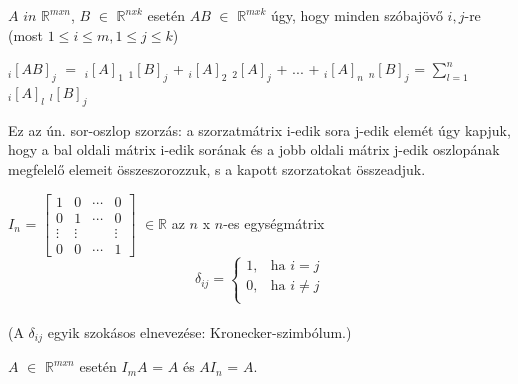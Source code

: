 	\begin{frame}

		\begin{tcolorbox}[title={Def.: Mátrixszorzás}]	
			$A$ $in$ $\mathbb{R}^{m x n}$, $B$ $\in$ $\mathbb{R}^{n x k}$ esetén $AB$ $\in$ $\mathbb{R}^{m x k}$ úgy, hogy minden szóbajövő $i, j$-re (most $1 \leq i \leq m, 1 \leq j \leq k$)
			\mmedskip
	
			$_{i} [AB]_j$ $=$ $_{i} [A]_1$ $_{1} [B]_j$ + $_{i} [A]_2$ $_{2} [A]_j$ + $...$ + $_{i} [A]_n$ $_{n} [B]_j$ = $\sum_{l = 1}^n$ $_{i} [A]_l$ $_{l} [B]_j$
			\mmedskip

			Ez az ún. sor-oszlop szorzás: a szorzatmátrix i-edik sora j-edik elemét úgy kapjuk, hogy a bal oldali mátrix i-edik sorának és a jobb oldali mátrix j-edik oszlopának megfelelő elemeit összeszorozzuk, s a kapott szorzatokat összeadjuk.
		\end{tcolorbox}		
		
		\begin{tcolorbox}[title={Def.: Egységmátrix}]	
			$I_n$ = $\begin{bmatrix} 
  				1 & 0 & \cdots & 0 \\ 
  				0 & 1 & \cdots & 0 \\
  				\vdots & \vdots &  & \vdots \\
  				0 & 0 & \cdots & 1
			\end{bmatrix}$ $\in \mathbb{R}$ az $n$ x $n$-es egységmátrix\\
			
			
			\[
   				{\delta}_{ij} = 
			\begin{cases}
   				1, & \text{ha } i = j\\
    			0, & \text{ha } i \neq j \\
			\end{cases}
			\]\\
			
			(A ${\delta}_{ij}$ egyik szokásos elnevezése: Kronecker-szimbólum.)
		\end{tcolorbox}	
	
		\begin{tcolorbox}[title={Tétel: Egységmátrix}]	
			$A$ $\in$ $\mathbb{R}^{m x n}$ esetén $I_mA$ = $A$ és $AI_n$ = $A$.
		\end{tcolorbox}
		
	\end{frame}
	

